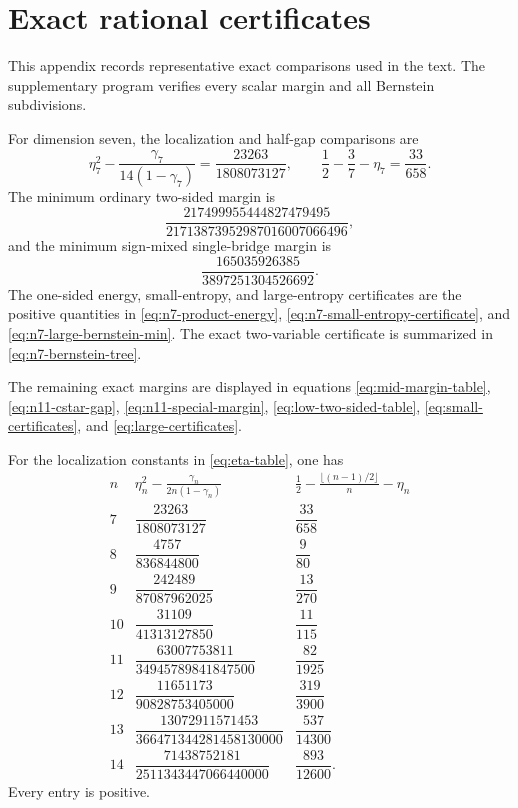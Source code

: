 \documentclass[11pt]{article}
\theoremstyle{definition}
\newcommand{\1}{\mathbf{1}}
\begin{document}
\section{Exact rational certificates}\label{app:certificates}

This appendix records representative exact comparisons used in the text.
The supplementary program verifies every scalar margin and all Bernstein
subdivisions.

For dimension seven, the localization and half-gap comparisons are
\[
 \eta_7^2-\frac{\gamma_7}{14(1-\gamma_7)}
 =\frac{23263}{1808073127},
 \qquad
 \frac12-\frac37-\eta_7=\frac{33}{658}.
 \tag{A.1}\label{eq:app-n7-localization}
\]
The minimum ordinary two-sided margin is
\[
 \frac{217499955444827479495}
 {21713873952987016007066496},
\]
and the minimum sign-mixed single-bridge margin is
\[
 \frac{165035926385}{3897251304526692}.
\]
The one-sided energy, small-entropy, and large-entropy certificates are the
positive quantities in \eqref{eq:n7-product-energy},
\eqref{eq:n7-small-entropy-certificate}, and
\eqref{eq:n7-large-bernstein-min}.  The exact two-variable certificate is
summarized in \eqref{eq:n7-bernstein-tree}.

The remaining exact margins are displayed in equations
\eqref{eq:mid-margin-table}, \eqref{eq:n11-cstar-gap},
\eqref{eq:n11-special-margin}, \eqref{eq:low-two-sided-table},
\eqref{eq:small-certificates}, and \eqref{eq:large-certificates}.

For the localization constants in \eqref{eq:eta-table}, one has
\[
\begin{array}{c|c|c}
 n&\displaystyle
 \eta_n^2-\frac{\gamma_n}{2n(1-\gamma_n)}
 &\displaystyle
 \frac12-\frac{\lfloor(n-1)/2\rfloor}{n}-\eta_n\\ \hline
 7&\dfrac{23263}{1808073127}&\dfrac{33}{658}\\[3mm]
 8&\dfrac{4757}{836844800}&\dfrac9{80}\\[3mm]
 9&\dfrac{242489}{87087962025}&\dfrac{13}{270}\\[3mm]
 10&\dfrac{31109}{41313127850}&\dfrac{11}{115}\\[3mm]
 11&\dfrac{63007753811}{34945789841847500}&\dfrac{82}{1925}\\[3mm]
 12&\dfrac{11651173}{90828753405000}&\dfrac{319}{3900}\\[3mm]
 13&\dfrac{13072911571453}{366471344281458130000}&\dfrac{537}{14300}\\[3mm]
 14&\dfrac{71438752181}{2511343447066440000}&\dfrac{893}{12600}.
\end{array}
\tag{A.2}\label{eq:localization-certificates}
\]
Every entry is positive.
\end{document}

